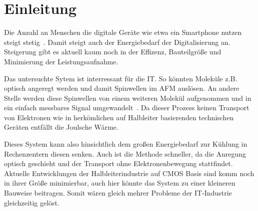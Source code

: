 \chapter{Einleitung}
    Die Anzahl an Menschen die digitale Geräte wie etwa ein Smartphone nutzen steigt stetig~\cite{Statista}.
    Damit steigt auch der Energiebedarf der Digitalisierung an.
    Steigerung gibt es aktuell kaum noch in der Effizenz, Bauteilgröße und Minimierung der Leistungsaufnahme.

    Das untersuchte Sytem ist interressant für die IT.
    So könnten Moleküle z.B. optisch angeregt werden und damit Spinwellen im AFM auslösen. 
    An andere Stelle werden diese Spinwellen von einem weiteren Molekül aufgenommen und in ein einfach messbares Signal umgewandelt~\cite{SINFONIA}.
    Da dieser Prozess keinen Transport von Elektronen wie in herkömlichen auf Halbleiter basierenden technischen Geräten entfällt die Joulsche Wärme.

    Dieses System kann also hinsichtlich dem großen Energiebedarf zur Kühlung in Rechenzentern diesen senken.
    Auch ist die Methode schneller, da die Anregung optisch geschieht und der Transport ohne Elektronenbewegung stattfindet.
    Aktuelle Entwicklungen der Halbleiterindustrie auf CMOS Basis sind komm noch in ihrer Größe minimierbar, auch hier könnte das System zu einer kleineren Bauweise beitragen. 
    Somit wären gleich mehrer Probleme der IT-Industrie gleichzeitig gelöst.

